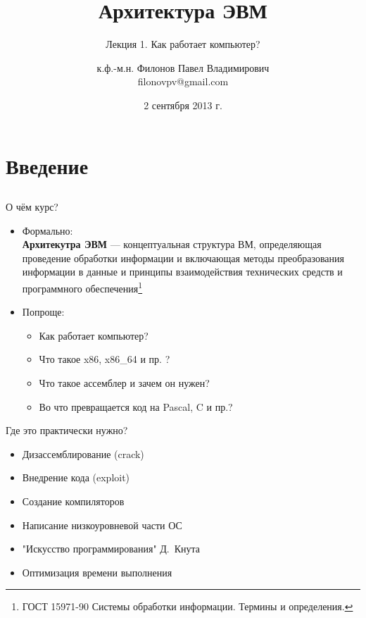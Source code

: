 \documentclass{beamer}
\title{Архитектура ЭВМ}
\subtitle{Лекция 1. Как работает компьютер?}
\author{к.ф.-м.н. Филонов Павел Владимирович \\ filonovpv@gmail.com}
\date{2 сентября 2013 г.}
\institute[МГТУ ГА] 
{
    Московский Государственный Технический Университет \\
    Гражданской Авиации
}
\begin{document}
    \frame{\titlepage}
    \section{Введение}
    \subsection{}
    \begin{frame}{О чём курс?}
        \begin{itemize}
            \item Формально:\\
            {\bf Архитекутра ЭВМ} --- концептуальная структура ВМ, определяющая проведение обработки информации и включающая методы преобразования информации в данные и принципы взаимодействия технических средств и программного обеспечения\footnote{ГОСТ 15971-90 Системы обработки информации. Термины и определения.}
            \bigskip

        \item Попроще:
        \begin{itemize}
            \item Как работает компьютер?
            \item Что такое x86, x86\_64 и пр. ?
            \item Что такое ассемблер и зачем он нужен?
            \item Во что превращается код на Pascal, C и пр.?
        \end{itemize}
        \end{itemize}
    \end{frame}
    \begin{frame}{Где это практически нужно?}
        \begin{itemize}
            \item Дизассемблирование (crack)
            \item Внедрение кода (exploit)
            \item Создание компиляторов
            \item Написание низкоуровневой части ОС
            \item "Искусство программирования" Д.~Кнута
            \item Оптимизация времени выполнения
        \end{itemize}
    \end{frame}
\end{document}
